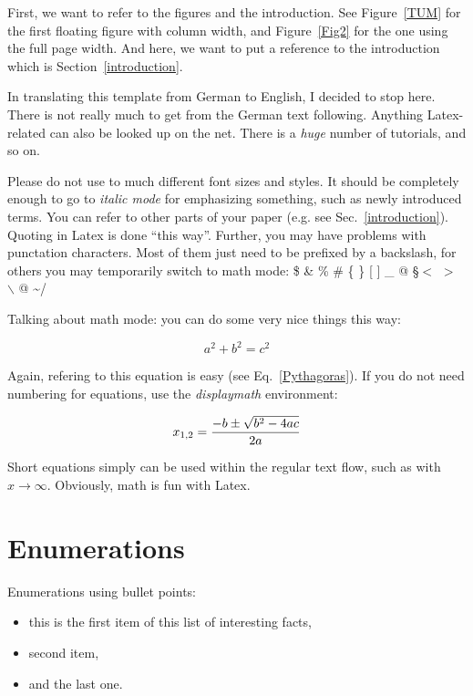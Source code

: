 \documentclass[A4,twocolumn]{article}
\begin{document}
First, we want to refer to the figures and the introduction.
See Figure~\ref{TUM} for the first floating figure with column width,
and Figure~\ref{Fig2} for the one using the full page width.
And here, we want to put a reference to the introduction which is
Section~\ref{introduction}.

In translating this template from German to English, I decided to
stop here. There is not really much to get from the German text
following. Anything Latex-related can also be looked up on the
net. There is a {\it huge} number of tutorials, and so on.

Please do not use to much different font sizes and styles. It should
be completely enough to go to {\em italic mode} for emphasizing something,
such as newly introduced terms.
You can refer to other parts of your paper (e.g. see 
Sec.~\ref{introduction}).
Quoting in Latex is done ``this way''.
Further, you may have problems with punctation characters.
Most of them just need to be prefixed by a backslash, for others you may
temporarily switch to math mode:
\$ \& \% \# \{ \} [ ] \_ @ \S $<$ $>$ $\backslash$ @ \textasciitilde /

Talking about math mode: you can do some very nice things this way:

\begin{equation}
a^2 + b^2 = c^2
\label{Pythagoras}
\end{equation}

Again, refering to this equation is easy (see Eq.~\ref{Pythagoras}).
If you do not need numbering for equations, use the {\em displaymath}
environment:

\begin{displaymath}
x_{1,2} = \frac{-b \pm \sqrt{b^2-4ac}}{2a}\\
\end{displaymath}

Short equations simply can be used within the regular text flow, such
as with $x \to \infty$. Obviously, math is fun with Latex.


\section{Enumerations}

Enumerations using bullet points:

\begin{itemize}
	\item this is the first item of this list of interesting facts,
	\item second item,
	\item and the last one.
\end{itemize}
\end{document}
